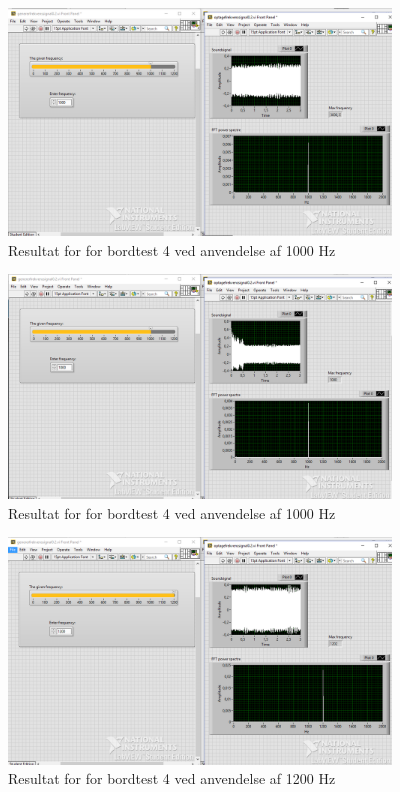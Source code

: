			\begin{figure}[htb]
			\centering
				\includegraphics[width=4in]{Bordtest41000Hz}
				\caption{Resultat for for bordtest 4 ved anvendelse af 1000 Hz}	
				\label{fig:bt41000}
			\end{figure} 
			
			\begin{figure}[htb]
			\centering
				\includegraphics[width=4in]{Bordtest41000Hzb}
				\caption{Resultat for for bordtest 4 ved anvendelse af 1000 Hz}	
				\label{fig:bt41000b}
			\end{figure} 
			
			\begin{figure}[htb]
			\centering
				\includegraphics[width=4in]{Bordtest41200Hz}
				\caption{Resultat for for bordtest 4 ved anvendelse af 1200 Hz}	
				\label{fig:bt41200}
			\end{figure} 
	
